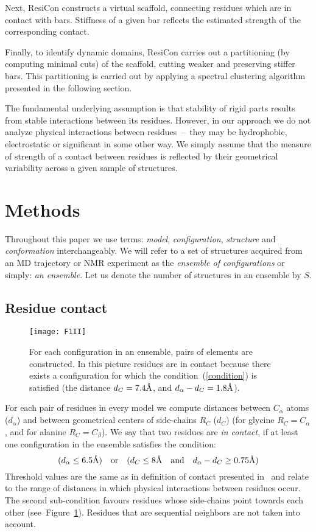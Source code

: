 \documentclass[a4paper,11pt,twoside]{book}%
\begin{document}
Next, ResiCon constructs a virtual scaffold, connecting residues which are in contact with bars.
Stiffness of a given bar reflects the estimated strength of the corresponding contact. 

Finally, to identify dynamic domains, ResiCon carries out a partitioning (by computing minimal cuts) of the scaffold, cutting weaker and preserving stiffer bars.
This partitioning is carried out by applying a spectral clustering algorithm presented in the following section.

The fundamental underlying assumption is that stability of rigid parts results from stable interactions between its residues.
However, in our approach we do not analyze physical interactions between residues~--~they may be hydrophobic, electrostatic or significant in some other way.
We simply assume that the measure of strength of a contact between residues is reflected by their geometrical variability across a given sample of structures.

\section{Methods}
Throughout this paper we use terms: \emph{model}, \emph{configuration}, \emph{structure} and \emph{conformation} interchangeably.
We will refer to a set of structures acquired from an MD trajectory or NMR experiment as the \emph{ensemble of configurations} or simply: \emph{an ensemble}.
Let us denote the number of structures in an ensemble by $S$.

\subsection*{Residue contact}
\begin{figure}
\centering
\texttt{[image: F1II]}
\caption{
For each configuration in an ensemble, pairs of elements are constructed.
In this picture residues are in contact because there exists a configuration for which the condition~(\ref{condition}) is satisfied (the distance $d_C=7.4\mbox{\normalfont\AA}$, and $d_\alpha-d_C = 1.8\mbox{\normalfont\AA}$).
}
\label{contact}
\end{figure}

For each pair of residues in every model we compute distances between $C_\alpha$ atoms ($d_\alpha$) and between geometrical centers of side-chains $R_C$ ($d_C$) (for glycine $R_C = C_\alpha$, and for alanine $R_C = C_\beta$).
We say that two residues are \emph{in contact}, if at least one configuration in the ensemble satisfies the condition:
\begin{equation}
(d_\alpha \leq 6.5\mbox{\normalfont\AA})\quad \text{or} \quad (d_C \leq 8\mbox{\normalfont\AA}\quad \text{and} \quad d_\alpha - d_C \geq 0.75\mbox{\normalfont\AA})
\label{condition}
\end{equation}
Threshold values are the same as in definition of contact presented in~\cite{daniluk2011novel} and relate to the range of distances in which physical interactions between residues occur.
The second sub-condition favours residues whose side-chains point towards each other (see~Figure~\ref{contact}). 
Residues that are sequential neighbors are not taken into account.
\end{document}
